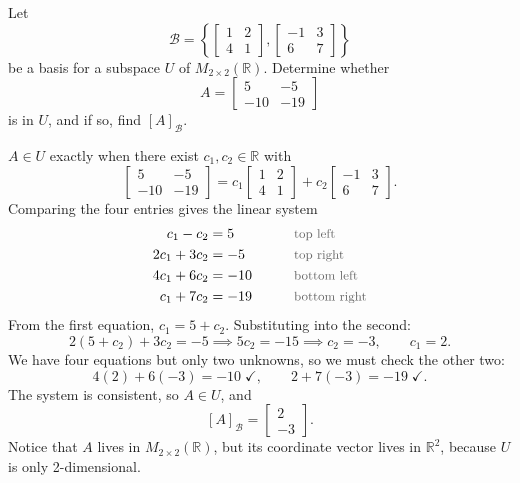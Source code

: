 \begin{example}
Let
\[
\mathcal{B} = \left\{ \begin{bmatrix} 1 & 2 \\ 4 & 1 \end{bmatrix}, \begin{bmatrix} -1 & 3 \\ 6 & 7 \end{bmatrix} \right\}
\]
be a basis for a subspace $U$ of $M_{2 \times 2}(\mathbb{R})$. Determine whether
\[
A = \begin{bmatrix} 5 & -5 \\ -10 & -19 \end{bmatrix}
\]
is in $U$, and if so, find $[A]_{\mathcal{B}}$.

\begin{solution}
$A \in U$ exactly when there exist $c_1, c_2 \in \mathbb{R}$ with
\[
\begin{bmatrix} 5 & -5 \\ -10 & -19 \end{bmatrix} = c_1\begin{bmatrix} 1 & 2 \\ 4 & 1 \end{bmatrix} + c_2\begin{bmatrix} -1 & 3 \\ 6 & 7 \end{bmatrix}.
\]
Comparing the four entries gives the linear system
\begin{alignat*}{2}
c_1 - c_2 &= 5 &\qquad& \by{top left} \\
2c_1 + 3c_2 &= -5 && \by{top right} \\
4c_1 + 6c_2 &= -10 && \by{bottom left} \\
c_1 + 7c_2 &= -19 && \by{bottom right}
\end{alignat*}
From the first equation, $c_1 = 5 + c_2$. Substituting into the second:
\[
2(5 + c_2) + 3c_2 = -5 \implies 5c_2 = -15 \implies c_2 = -3, \qquad c_1 = 2.
\]
We have four equations but only two unknowns, so we must check the other two:
\[
4(2) + 6(-3) = -10 \;\checkmark, \qquad 2 + 7(-3) = -19 \;\checkmark.
\]
The system is consistent, so $A \in U$, and
\[
[A]_{\mathcal{B}} = \begin{bmatrix} 2 \\ -3 \end{bmatrix}.
\]
Notice that $A$ lives in $M_{2 \times 2}(\mathbb{R})$, but its coordinate vector lives in $\mathbb{R}^2$, because $U$ is only 2-dimensional.
\end{solution}
\end{example}

